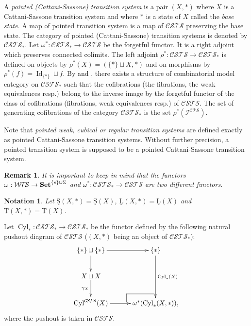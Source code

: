 \documentclass[a4paper,12pt]{amsart}
\newtheorem{nota}[thm]{Notation}
\newtheorem{rem}[thm]{Remark}
\begin{document}
A \emph{pointed (Cattani-Sassone) transition system} is a pair
$(X,*)$ where $X$ is a Cattani-Sassone transition system and
where $*$ is a state of $X$ called the \emph{base state}. A map
of pointed transition system is a map of ${\mathcal{C\!S\!T\!S}}$ preserving the base
state. The category of pointed (Cattani-Sassone) transition systems is
denoted by ${\mathcal{C\!S\!T\!S}}_*$. Let $\omega^*:{\mathcal{C\!S\!T\!S}}_* \to {\mathcal{C\!S\!T\!S}}$ be the
forgetful functor. It is a right adjoint which preserves connected
colimits. The left adjoint $\rho^*:{\mathcal{C\!S\!T\!S}} \rightarrow {\mathcal{C\!S\!T\!S}}_*$ is
defined on objects by $\rho^*(X) = (\{*\} \sqcup X,*)$ and on
morphisms by $\rho^*(f) = \operatorname{Id}_{\{*\}} \sqcup f$.  By
\cite[Proposition~1.57]{MR95j:18001} and \cite[Theorem~2.7]{undercat},
there exists a structure of combinatorial model category on ${\mathcal{C\!S\!T\!S}}_*$
such that the cofibrations (the fibrations, the weak equivalences
resp.)  belong to the inverse image by the forgetful functor of the
class of cofibrations (fibrations, weak equivalences resp.) of
${\mathcal{C\!S\!T\!S}}$. The set of generating cofibrations of the category ${\mathcal{C\!S\!T\!S}}_*$
is the set $\rho^*({\mathcal{I}}^{\mathcal{C\!T\!S}})$.

Note that \emph{pointed weak, cubical or regular transition systems}
are defined exactly as pointed Cattani-Sassone transition
systems. Without further precision, a pointed transition system is
supposed to be a pointed Cattani-Sassone transition system.

\begin{rem} It is important to keep in mind that the functors
  $\omega:{\mathcal{W\!T\!S}} \to {{{\rm{\mathbf{{Set}}}}}}^{\{s\}\cup \Sigma}$ and $\omega^*:{\mathcal{C\!S\!T\!S}}_* \to
  {\mathcal{C\!S\!T\!S}}$ are two different functors.
\end{rem}

\begin{nota} Let $\operatorname{\underline{S}}(X,*)=\operatorname{\underline{S}}(X)$, $\operatorname{\underline{L}}(X,*)=\operatorname{\underline{L}}(X)$ and
  $\operatorname{\underline{T}}(X,*)=\operatorname{\underline{T}}(X)$.
\end{nota}

Let $\operatorname{{Cyl}}_*:{\mathcal{C\!S\!T\!S}}_* \to {\mathcal{C\!S\!T\!S}}_*$ be the functor defined by the
following natural pushout diagram of ${\mathcal{C\!S\!T\!S}}$ ($(X,*)$ being an
object of ${\mathcal{C\!S\!T\!S}}_*$):
\[
\xymatrix@C=3em {
  \{*\} \sqcup \{*\} {\ar@{->}[r]^-{{}}} {\ar@{->}[d]_-{{}}} & \{*\} \ar[dd]^-{\operatorname{{Cyl}}_*(X)} \\
  X \sqcup X {\ar@{->}[d]_-{{\gamma_X}}} & \\
  \operatorname{{Cyl}}^{\mathcal{C\!S\!T\!S}}(X) {\ar@{->}[r]^-{{}}} & {  \ar@{-}[]+L+<-6pt,+2pt>;[]+LU+<-6pt,+6pt>  \ar@{-}[]+U+<-2pt,+6pt>;[]+LU+<-6pt,+6pt>}
  \omega^*(\operatorname{{Cyl}}_*(X,*)), }
\]
where the pushout is taken in ${\mathcal{C\!S\!T\!S}}$.
\end{document}
